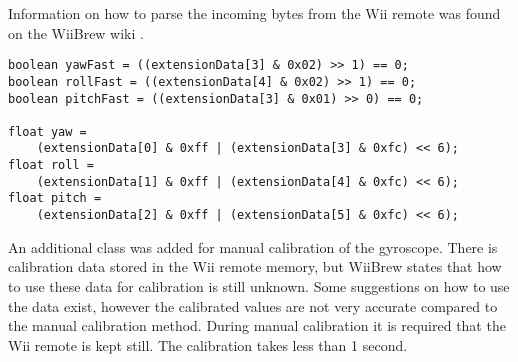 Information on how to parse the incoming bytes from the Wii remote was found on the WiiBrew wiki \cite{wiiBrew}. 


\begin{lstlisting}
boolean yawFast = ((extensionData[3] & 0x02) >> 1) == 0;
boolean rollFast = ((extensionData[4] & 0x02) >> 1) == 0;
boolean pitchFast = ((extensionData[3] & 0x01) >> 0) == 0;

float yaw = 
	(extensionData[0] & 0xff | (extensionData[3] & 0xfc) << 6);
float roll = 
	(extensionData[1] & 0xff | (extensionData[4] & 0xfc) << 6);
float pitch = 
	(extensionData[2] & 0xff | (extensionData[5] & 0xfc) << 6);
\end{lstlisting}

An additional class was added for manual calibration of the gyroscope. There is calibration data stored in the Wii remote memory, but WiiBrew states that how to use these data for calibration is still unknown. Some suggestions on how to use the data exist, however the calibrated values are not very accurate compared to the manual calibration method. During manual calibration it is required that the Wii remote is kept still. The calibration takes less than 1 second.